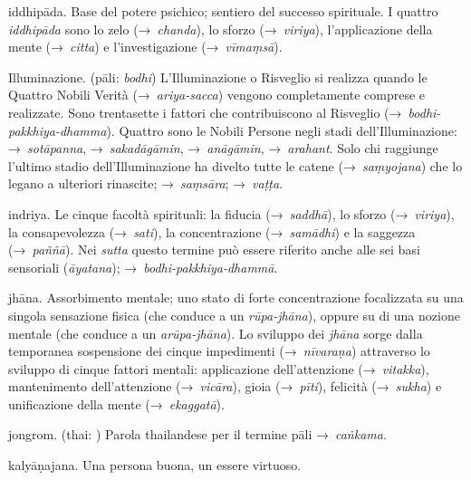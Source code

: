 \begin{glossarydescription}

\item[iddhipāda.]\label{glossary-iddhipada} Base del potere psichico; sentiero del
  successo spirituale. I quattro \emph{iddhipāda} sono lo zelo
  (→~\emph{chanda}), lo sforzo (→~\emph{viriya}), l'applicazione della mente
  (→~\emph{citta}) e l'investigazione (→~\emph{vīmaṃsā}).

\item[Illuminazione.] (pāli: \emph{bodhi}) L'Illuminazione o Risveglio si
  realizza quando le Quattro Nobili Verità (→~\emph{ariya-sacca}) vengono
  completamente comprese e realizzate. Sono trentasette i fattori che
  contribuiscono al Risveglio (→~\emph{bodhi-pakkhiya-dhamma}). Quattro sono le
  Nobili Persone negli stadi dell'Illuminazione: →~\emph{sotāpanna},
  →~\emph{sakadāgāmin}, →~\emph{anāgāmin}, →~\emph{arahant}. Solo chi raggiunge
  l'ultimo stadio dell'Illuminazione ha divelto tutte le catene
  (→~\emph{saṃyojana}) che lo legano a ulteriori rinascite; →~\emph{saṃsāra};
  →~\emph{vaṭṭa}.

\item[indriya.] Le cinque facoltà spirituali: la fiducia
  (→~\emph{saddhā}), lo sforzo (→~\emph{viriya}), la consapevolezza
  (→~\emph{sati}), la concentrazione (→~\emph{samādhi}) e la saggezza
  (→~\emph{paññā}). Nei \emph{sutta} questo termine può essere riferito anche
  alle sei basi sensoriali (\emph{āyatana}); →~\emph{bodhi-pakkhiya-dhammā}.


\item[jhāna.] Assorbimento mentale; uno stato di forte concentrazione
  focalizzata su una singola sensazione fisica (che conduce a un
  \emph{rūpa-jhāna}), oppure su di una nozione mentale (che conduce a un
  \emph{arūpa-jhāna}). Lo sviluppo dei \emph{jhāna} sorge dalla temporanea
  sospensione dei cinque impedimenti (→~\emph{nīvaraṇa}) attraverso lo sviluppo
  di cinque fattori mentali: applicazione dell'attenzione (→~\emph{vitakka}),
  mantenimento dell'attenzione (→~\emph{vicāra}), gioia (→~\emph{pīti}),
  felicità (→~\emph{sukha}) e unificazione della mente (→~\emph{ekaggatā}).

\item[jongrom.] (thai: ) Parola thailandese per il termine
  pāli →~\emph{caṅkama}.


\item[kalyāṇajana.] Una persona buona, un essere virtuoso.


\end{glossarydescription}
